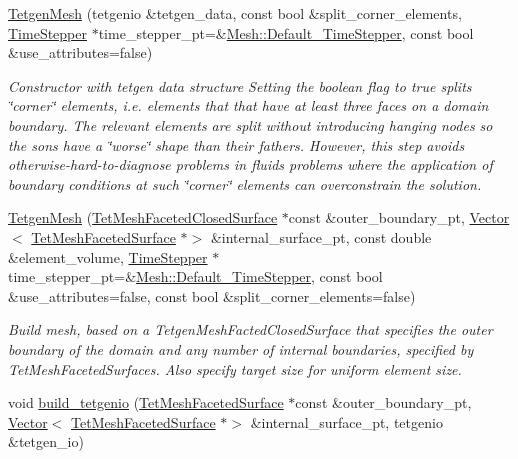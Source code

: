 \begin{DoxyCompactItemize}
\hyperlink{classoomph_1_1TetgenMesh_a0fa783641ea515a942941425c468df01}{Tetgen\+Mesh} (tetgenio \&tetgen\+\_\+data, const bool \&split\+\_\+corner\+\_\+elements, \hyperlink{classoomph_1_1TimeStepper}{Time\+Stepper} $\ast$time\+\_\+stepper\+\_\+pt=\&\hyperlink{classoomph_1_1Mesh_a12243d0fee2b1fcee729ee5a4777ea10}{Mesh\+::\+Default\+\_\+\+Time\+Stepper}, const bool \&use\+\_\+attributes=false)
\begin{DoxyCompactList}\small\item\em Constructor with tetgen data structure Setting the boolean flag to true splits \char`\"{}corner\char`\"{} elements, i.\+e. elements that that have at least three faces on a domain boundary. The relevant elements are split without introducing hanging nodes so the sons have a \char`\"{}worse\char`\"{} shape than their fathers. However, this step avoids otherwise-\/hard-\/to-\/diagnose problems in fluids problems where the application of boundary conditions at such \char`\"{}corner\char`\"{} elements can overconstrain the solution. \end{DoxyCompactList}\item 
\hyperlink{classoomph_1_1TetgenMesh_afe49b6f5fc0ff75d8ddfbfab204d6f20}{Tetgen\+Mesh} (\hyperlink{classoomph_1_1TetMeshFacetedClosedSurface}{Tet\+Mesh\+Faceted\+Closed\+Surface} $\ast$const \&outer\+\_\+boundary\+\_\+pt, \hyperlink{classoomph_1_1Vector}{Vector}$<$ \hyperlink{classoomph_1_1TetMeshFacetedSurface}{Tet\+Mesh\+Faceted\+Surface} $\ast$$>$ \&internal\+\_\+surface\+\_\+pt, const double \&element\+\_\+volume, \hyperlink{classoomph_1_1TimeStepper}{Time\+Stepper} $\ast$time\+\_\+stepper\+\_\+pt=\&\hyperlink{classoomph_1_1Mesh_a12243d0fee2b1fcee729ee5a4777ea10}{Mesh\+::\+Default\+\_\+\+Time\+Stepper}, const bool \&use\+\_\+attributes=false, const bool \&split\+\_\+corner\+\_\+elements=false)
\begin{DoxyCompactList}\small\item\em Build mesh, based on a Tetgen\+Mesh\+Facted\+Closed\+Surface that specifies the outer boundary of the domain and any number of internal boundaries, specified by Tet\+Mesh\+Faceted\+Surfaces. Also specify target size for uniform element size. \end{DoxyCompactList}\item 
void \hyperlink{classoomph_1_1TetgenMesh_a5a805a008ca5ae48af1aaae06de092b1}{build\+\_\+tetgenio} (\hyperlink{classoomph_1_1TetMeshFacetedSurface}{Tet\+Mesh\+Faceted\+Surface} $\ast$const \&outer\+\_\+boundary\+\_\+pt, \hyperlink{classoomph_1_1Vector}{Vector}$<$ \hyperlink{classoomph_1_1TetMeshFacetedSurface}{Tet\+Mesh\+Faceted\+Surface} $\ast$$>$ \&internal\+\_\+surface\+\_\+pt, tetgenio \&tetgen\+\_\+io)

\end{DoxyCompactItemize}
